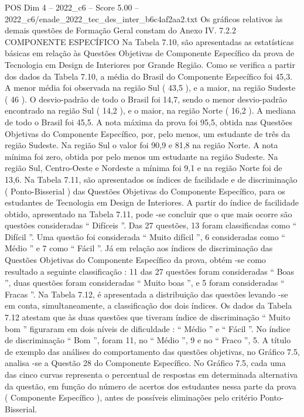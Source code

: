 \begin{textsample}{POS Dim 4 – 2022\_c6 – Score 5.00 – 2022\_c6/enade\_2022\_tec\_des\_inter\_b6c4af2aa2.txt}
Os gráficos relativos às demais questões de Formação Geral constam do Anexo IV. 7.2.2 COMPONENTE ESPECÍFICO Na Tabela 7.10, são apresentadas as estatísticas básicas em relação às Questões Objetivas de Componente Específico da prova de Tecnologia em Design de Interiores por Grande Região.
Como se verifica a partir dos dados da Tabela 7.10, a média do Brasil do Componente Específico foi 45,3.
A menor média foi observada na região Sul ( 43,5 ), e a maior, na região Sudeste ( 46 ).
O desvio-padrão de todo o Brasil foi 14,7, sendo o menor desvio-padrão encontrado na região Sul ( 14,2 ), e o maior, na região Norte ( 16,2 ).
A mediana de todo o Brasil foi 45,5.
A nota máxima da prova foi 95,5, obtida nas Questões Objetivas do Componente Específico, por, pelo menos, um estudante de três da região Sudeste.
Na região Sul o valor foi 90,9 e 81,8 na região Norte.
A nota mínima foi zero, obtida por pelo menos um estudante na região Sudeste.
Na região Sul, Centro-Oeste e Nordeste a mínima foi 9,1 e na região Norte foi de 13,6.
Na Tabela 7.11, são apresentados os índices de facilidade e de discriminação ( Ponto-Bisserial ) das Questões Objetivas do Componente Específico, para os estudantes de Tecnologia em Design de Interiores.
A partir do índice de facilidade obtido, apresentado na Tabela 7.11, pode -se concluir que o que mais ocorre são questões consideradas “ Difíceis ”.
Das 27 questões, 13 foram classificadas como “ Difícil ”.
Uma questão foi considerada “ Muito difícil ”, 6 consideradas como “ Médio ” e 7 como “ Fácil ”.
Já em relação aos índices de discriminação das Questões Objetivas do Componente Específico da prova, obtém -se como resultado a seguinte classificação : 11 das 27 questões foram consideradas “ Boas ”, duas questões foram consideradas “ Muito boas ”, e 5 foram consideradas “ Fracas ”.
Na Tabela 7.12, é apresentada a distribuição das questões levando -se em conta, simultaneamente, a classificação dos dois índices.
Os dados da Tabela 7.12 atestam que às duas questões que tiveram índice de discriminação “ Muito bom ” figuraram em dois níveis de dificuldade : “ Médio ” e “ Fácil ”.
No índice de discriminação “ Bom ”, foram 11, no “ Médio ”, 9 e no “ Fraco ”, 5.
A título de exemplo das análises do comportamento das questões objetivas, no Gráfico 7.5, analisa -se a Questão 28 do Componente Específico.
No Gráfico 7.5, cada uma das cinco curvas representa o percentual de respostas em determinada alternativa da questão, em função do número de acertos dos estudantes nessa parte da prova ( Componente Específico ), antes de possíveis eliminações pelo critério Ponto-Bisserial.

\end{textsample}
